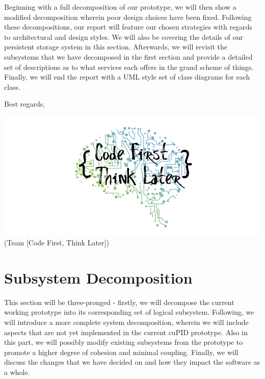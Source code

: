 \documentclass[12pt,letterpaper]{article}
\begin{document}
Beginning with a full decomposition of our prototype, we will then show a modified decomposition wherein poor design choices have been fixed. Following these decompositions, our report will feature our chosen strategies with regards to architectural and design styles. We will also be covering the details of our persistent storage system in this section. Afterwards, we will revisit the subsystems that we have decomposed in the first section and provide a detailed set of descriptions as to what services each offers in the grand scheme of things. Finally, we will end the report with a UML style set of class diagrams for each class.

\vspace{1em}

\noindent Best regards,

\vspace{1em}

\begin{center}
	\includegraphics[scale=0.4]{imgs/logo.png} \\ \footnotesize{(Team [Code First, Think Later])}
\end{center}

\section{Subsystem Decomposition}

This section will be three-pronged - firstly, we will decompose the current working prototype into its corresponding set of logical subsystem. Following, we will introduce a more complete system decomposition, wherein we will include aspects that are not yet implemented in the current cuPID prototype. Also in this part, we will possibly modify existing subsystems from the prototype to promote a higher degree of cohesion and minimal coupling. Finally, we will discuss the changes that we have decided on and how they impact the software as a whole. 
\end{document}
